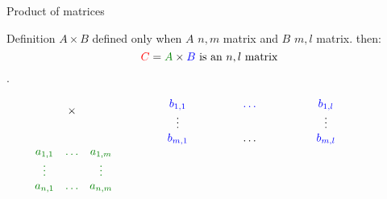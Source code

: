 \documentclass{beamer}
\begin{document}
\begin{frame}{Product of matrices}

  \begin{block}{Definition}
    \alert{$A \times B$ defined only when $A$ $n,m$ matrix and $B$ $m,l$ matrix.} then: \[{\color{red}C} = {\color{darkgreen} A} \times {\color{blue} B}\textnormal{  is an $n,l$ matrix} \].
    
    \[
    \begin{array}{cccccc}
      & \multirow{2}{*}{$\times$} & & \color{blue}b_{1,1} &\color{blue} \dots & \color{blue} b_{1,l}\\
      &                           & & \vdots &       & \vdots\\
      &                           & &\color{blue} b_{m,1}  & \dots & \color{blue}b_{m, l}\\
      \color{darkgreen}a_{1,1} &\color{darkgreen} \dots & \color{darkgreen}a_{1,m} & \phantom{\color{red}a_{1,1}b_{1,1} + \dots a_{1,m}b_{m,1}}  & \phantom{\color{red}\dots}  & \phantom{\color{red}a_{1,1}b_{1, l} + \dots + a_{1, m}b_{m, l}}\\
      \color{darkgreen}\vdots &       & \color{darkgreen}\vdots  &\phantom{\color{red}\vdots}  &  &\phantom{\color{red}\vdots} \\
      \color{darkgreen}a_{n,1} & \color{darkgreen}\dots & \color{darkgreen}a_{n, m}& \phantom{\color{red}a_{n,1}b_{1,1} + \dots a_{n,m}b_{m,1}}  & \phantom{\color{red}\dots}  & \phantom{\color{red}a_{n,1}b_{1, l} + \dots + a_{n, m}b_{m, l}}\\
    \end{array}
    \]
    
  \end{block}
  
\end{frame}
\end{document}
